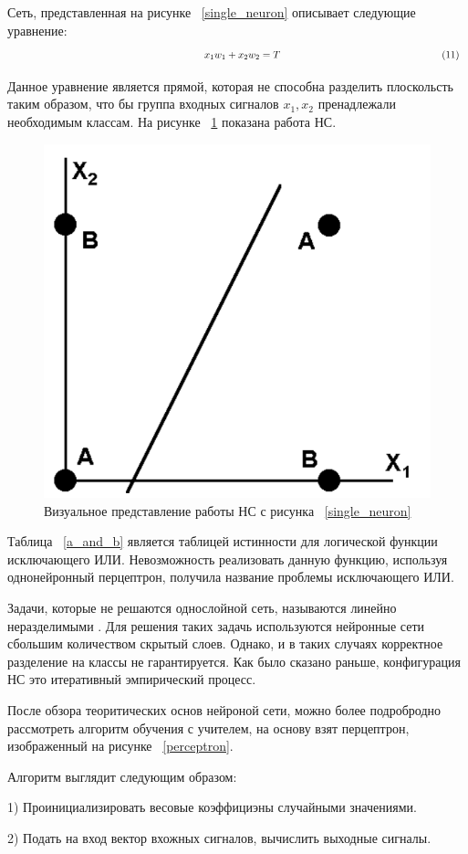 \documentclass[a4paper,english,russian]{G2-105}
\begin{document}
\par Сеть, представленная на рисунке ~\ref{single_neuron} описывает следующие уравнение:
\[
\ \hspace*{66mm} x_1 w_1 + x_2 w_2=T \ \hspace*{56mm} (11)
\] 
\par Данное уравнение является прямой, которая не способна разделить плоскольсть таким образом, что бы группа входных сигналов $x_1, x_2$ пренадлежали необходимым классам. На рисунке ~\ref{line_class} показана работа НС.
\begin{figure}
    \includegraphics[width=0.6\linewidth]{line_class.png}
    \caption{Визуальное представление работы НС с рисунка ~\ref{single_neuron}}
	\label{line_class}
\end{figure}
\par Таблица ~\ref{a_and_b} является таблицей истинности для логической функции исключающего ИЛИ. Невозможность реализовать данную функцию, используя однонейронный перцептрон, получила название проблемы исключающего ИЛИ.
\par Задачи, которые не решаются однослойной сеть, называются линейно неразделимыми \cite{13}. Для решения таких задачь используются нейронные сети сбольшим количеством скрытый слоев. Однако, и в таких случаях корректное разделение на классы не гарантируется. Как было сказано раньше, конфигурация НС это итеративный эмпирический процесс.
\par После обзора теоритических основ нейроной сети, можно более подробродно рассмотреть алгоритм обучения с учителем, на основу взят перцептрон, изображенный на рисунке ~\ref{perceptron}.
\par Алгоритм выглядит следующим образом:
\par 1) Проинициализировать весовые коэффициэны случайными значениями.
\par 2) Подать на вход вектор вхожных сигналов, вычислить выходные сигналы.
\end{document}
